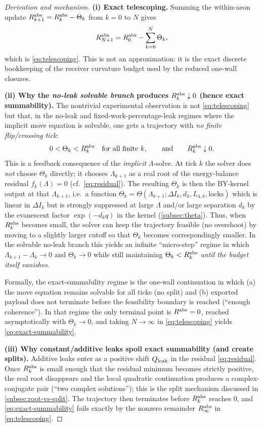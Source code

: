 \documentclass[11pt]{article}
\theoremstyle{definition}
\theoremstyle{plain}
\theoremstyle{remark}
\begin{document}
\begin{proof}[Derivation and mechanism]
\textbf{(i) Exact telescoping.}
Summing the within-aeon update $R^{\rm abs}_{k+1}=R^{\rm abs}_k-\Theta_k$ from $k=0$ to $N$ gives
\[
R^{\rm abs}_{N+1}=R^{\rm abs}_0-\sum_{k=0}^N\Theta_k,
\]
which is \eqref{eq:telescoping}.
This is not an approximation: it is the exact discrete bookkeeping of the receiver curvature budget used by the reduced
one-wall closures.

\textbf{(ii) Why the \emph{no-leak solvable branch} produces $R^{\rm abs}_k\downarrow 0$ (hence exact summability).}
The nontrivial experimental observation is not \eqref{eq:telescoping} but that, in the no-leak and
fixed-work-percentage-leak regimes where the implicit move equation is solvable, one gets a trajectory with
\emph{no finite flip/crossing tick}:
\[
0<\Theta_k<R^{\rm abs}_k\quad\text{for all finite }k,
\qquad\text{and}\qquad
R^{\rm abs}_k\downarrow 0.
\]
This is a feedback consequence of the \emph{implicit} $\Lambda$-solve.
At tick $k$ the solver does \emph{not} choose $\Theta_k$ directly; it chooses $\Lambda_{k+1}$ as a real root of the
energy-balance residual $f_k(\Lambda)=0$ (cf.\ \eqref{eq:residual}).
The resulting $\Theta_k$ is then the BY-kernel output at that $\Lambda_{k+1}$, i.e.\ a function
$\Theta_k=\Theta(\Lambda_{k+1};\Delta I_k,d_k,L_{4,k},\text{locks})$ which is linear in $\Delta I_k$ but is
strongly suppressed at large $\Lambda$ and/or large separation $d_k$ by the evanescent factor $\exp(-d_k q)$ in the kernel
(\cref{subsec:theta}).
Thus, when $R^{\rm abs}_k$ becomes small, the solver can keep the trajectory feasible (no overshoot) by moving to a
slightly larger cutoff so that $\Theta_k$ becomes correspondingly smaller.
In the solvable no-leak branch this yields an infinite ``micro-step'' regime in which
$\Lambda_{k+1}-\Lambda_k\to 0$ and $\Theta_k\to 0$ while still maintaining $\Theta_k<R^{\rm abs}_k$
\emph{until the budget itself vanishes}.

Formally, the exact-summability regime is the one-wall continuation in which (a) the move equation remains solvable for all
ticks (no split) and (b) exported payload does not terminate before the feasibility boundary is reached (``enough
coherence''). In that regime the only terminal point is $R^{\rm abs}=0$, reached asymptotically with $\Theta_k\to 0$, and
taking $N\to\infty$ in \eqref{eq:telescoping} yields \eqref{eq:exact-summability}.

\textbf{(iii) Why constant/additive leaks spoil exact summability (and create splits).}
Additive leaks enter as a positive shift $Q_{\rm leak}$ in the residual \eqref{eq:residual}.
Once $R^{\rm abs}_k$ is small enough that the residual minimum becomes strictly positive, the real root disappears and the
local quadratic continuation produces a complex-conjugate pair (``two complex solutions''); this is the split mechanism
discussed in \cref{subsec:root-vs-split}.
The trajectory then terminates before $R^{\rm abs}_k$ reaches $0$, and \eqref{eq:exact-summability} fails exactly by the
nonzero remainder $R^{\rm abs}_\infty$ in \eqref{eq:telescoping}.
\end{proof}
\end{document}
